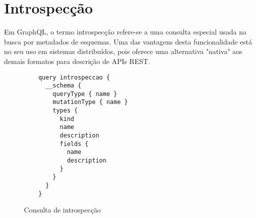 \section[Introspecção]{Introspecção}

Em GraphQL, o termo introspecção refere-se a uma consulta especial usada na busca por metadados de esquemas. Uma das vantagens desta funcionalidade está no seu uso em sistemas distribuídos, pois oferece uma alternativa "nativa" aos demais formatos para descrição de APIs REST.





\begin{figure}[H]
  \centering
  \begin{verbatim}
    query introspeccao {
      __schema {
        queryType { name }
        mutationType { name }
        types {
          kind
          name
          description
          fields {
            name
            description
          }
        }
      }
    }
  \end{verbatim}
  \caption{Consulta de introspecção}
\end{figure}
